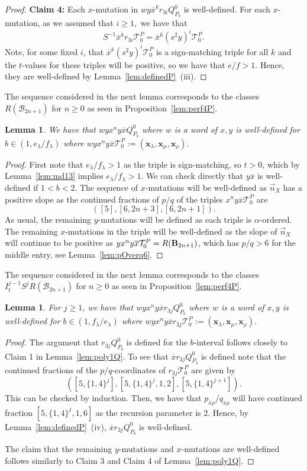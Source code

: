 \documentclass[11pt, reqno]{amsart}
\newtheorem{lemma}[thm]{Lemma}
\theoremstyle{remark}
\numberwithin{equation}{subsection}
\numberwithin{figure}{section}
\theoremstyle{customremark}
\newcommand{\Tt}{\mathcal{T}}
\newcommand{\vn}{{\vec{n}}}
\newcommand{\ovx}{{\ov{x}}}
\newcommand{\bB}{{\bf{B}}}
\newcommand{\ov}{\overline}
\newcommand{\al}{{\alpha}}
\newcommand{\la}{{\lambda}}
\newcommand{\T}{\mathcal{T}}
\begin{document}
\begin{proof}
   \textbf{Claim 4:} Each $x$-mutation in $wy\ov{x}^kr_{3i}Q_{P_b}^0$ is well-defined. 
    For each $x$-mutation, as we assumed that $i \geq 1,$ we have that \[S^{-1}\ov{x}^kr_{3i}\Tt_0^P= \ov{x}^k(s^2y)^i\Tt_0^P.\]
    Note, for some fixed $i$, that $\ov{x}^k(s^2y)^i\Tt_0^P$ is a sign-matching triple for all $k$ and the $t$-values for these triples will be positive, so we have that $e/f>1.$ Hence, they are well-defined by Lemma~\ref{lem:definedP}~(iii). 
    \end{proof}

     The sequence considered in the next lemma corresponds to the classes $R(\mathcal{B}_{2n+1})$ for $n \geq 0$ as seen in Proposition~\ref{lem:perf4P}.
\begin{lemma} \label{lem:bDefP3}
    We have that $wyx^ny\ov{x}Q_{P_b}^0$ where $w$ is a word of $x,y$ is well-defined for $b \in (1,e_\la/f_\la)$ where  $wyx^ny\ov{x}\Tt_0^P:=(\bm{x}_\la,\bm{x}_\mu,\bm{x}_\rho).$
\end{lemma}
\begin{proof}
    First note that $e_\la/f_\la>1$ as the triple is sign-matching, so $t>0$, which by Lemma~\ref{lem:md13} implies $e_\la/f_\la>1.$ We can check directly that $y\ov{x}$ is well-defined if $1<b<2.$ The sequence of $x$-mutations will be well-defined as $\vn_X$ has a positive slope as the continued fractions of $p/q$ of the triples $x^ny\ov{x}\Tt_0^P$ are
    \[ \left([5],[6,2n+3],[6,2n+1]\right).\] 
    As usual, the remaining $y$-mutations will be defined as each triple is $\al$-ordered. The remaining $x$-mutations in the triple will be well-defined as the slope of $\vn_X$ will continue to be positive as $yx^ny\ov{x}\Tt_0^P=R(\bB_{2n+1})$, which has $p/q > 6$ for the middle entry, see Lemma~\ref{lem:pOverq6}. 
\end{proof}

   The sequence considered in the next lemma corresponds to the classes $I_t^{j-1}S^jR(\mathcal{B}_{2n+1})$ for $n \geq 0$ as seen in Proposition~\ref{lem:perf4P}.
    \begin{lemma} \label{lem:bDefP4}
        For $j \geq 1$, we have that $wyx^ny\ov{x}r_{3j}Q_{P_b}^0$ where $w$ is a word of $x,y$ is well-defined for $b \in (1,f_\la/e_\la)$ where  $wyx^ny\ov{x}r_{3j}\Tt_0^P:=(\bm{x}_\la,\bm{x}_\mu,\bm{x}_\rho).$
    \end{lemma}
    \begin{proof}
 

The argument that $r_{3j}Q_{P_b}^0$ is defined for the $b$-interval follows closely to Claim 1 in Lemma~\ref{lem:poly1Q}. To see that $\ov{x}r_{3j}Q_{P_b}^0$ is defined note that the continued fractions of the $p/q$-coordinates of $r_{3j}\T_0^P$ are given by 
\[\left([5,\{1,4\}^j],[5,\{1,4\}^j,1,2],[5,\{1,4\}^{j+1}]\right).\] This can be checked by induction. Then, we have that $p_{\ovx\rho}/q_{\ovx\rho}$ will have continued fraction $[5,\{1,4\}^j,1,6]$ as the recursion parameter is $2$. Hence, by Lemma~\ref{lem:definedP}~(iv), $\ov{x}r_{3j}Q_{P_b}^0$ is well-defined. 

The claim that the remaining $y$-mutations and $x$-mutations are well-defined follows similarly to Claim 3 and Claim 4 of Lemma~\ref{lem:poly1Q}. 
    \end{proof}
\end{document}
